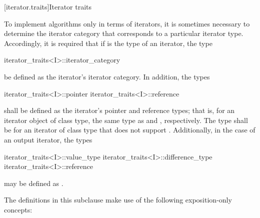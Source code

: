 [iterator.traits]{Iterator traits}

\pnum
{}%
To implement algorithms only in terms of iterators, it is sometimes necessary to
determine the iterator category that corresponds to a particular iterator type.
Accordingly, it is required that if
is the type of an iterator,
the type
%
\begin{codeblock}
iterator_traits<I>::iterator_category
\end{codeblock}
be defined as the iterator's iterator category.
In addition, the types
%
%
\begin{codeblock}
iterator_traits<I>::pointer
iterator_traits<I>::reference
\end{codeblock}
shall be defined as the iterator's pointer and reference types;
that is, for an
iterator object  of class type,
the same type as
 and
,
respectively.
The type
shall be 
for an iterator of class type 
that does not support .
Additionally, in the case of an output iterator, the types
\begin{codeblock}
iterator_traits<I>::value_type
iterator_traits<I>::difference_type
iterator_traits<I>::reference
\end{codeblock}
may be defined as .

\pnum
The definitions in this subclause make use of the following
exposition-only concepts:

